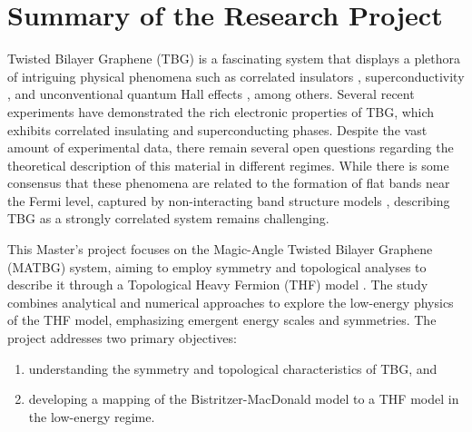 \documentclass[12pt]{report}
\begin{document}
%
%
\geraTitulo
%
\folhaDeRosto
%
%
%
\tableofcontents
\thispagestyle{empty}
\clearpage
%

\sectionfont{\scshape}



\chapter{Summary of the Research Project} \label{chp:abstract}

Twisted Bilayer Graphene (TBG) is a fascinating system that displays a plethora of intriguing physical phenomena such as correlated insulators \cite{cao2018_correlated}, superconductivity \cite{cao2018}, and unconventional quantum Hall effects \cite{unconv_QHE_tbg_2006}, among others. Several recent experiments have demonstrated the rich electronic properties of TBG, which exhibits correlated insulating and superconducting phases. Despite the vast amount of experimental data, there remain several open questions regarding the theoretical description of this material in different regimes. While there is some consensus that these phenomena are related to the formation of flat bands near the Fermi level, captured by non-interacting band structure models \cite{macdonald2011}, describing TBG as a strongly correlated system remains challenging.

This Master's project focuses on the Magic-Angle Twisted Bilayer Graphene (MATBG) system, aiming to employ symmetry and topological analyses to describe it through a Topological Heavy Fermion (THF) model \cite{topoheavyfermion2022}. The study combines analytical and numerical approaches to explore the low-energy physics of the THF model, emphasizing emergent energy scales and symmetries. The project addresses two primary objectives:
\begin{enumerate}[label=(\alph*)]
\item understanding the symmetry and topological characteristics of TBG, and
\item developing a mapping of the Bistritzer-MacDonald model \cite{macdonald2011} to a THF model in the low-energy regime.
\end{enumerate}
\end{document}

